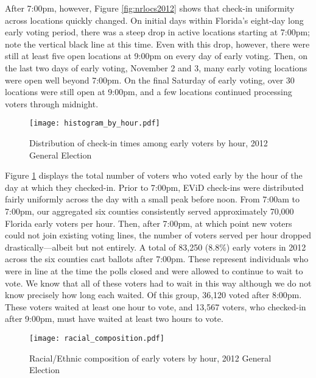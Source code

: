 \documentclass[12pt,titlepage]{article}
\begin{document}
After 7:00pm, however, Figure \ref{fig:nrlocs2012} shows that check-in
uniformity across locations quickly changed.  On initial days within
Florida's eight-day long early voting period, there was a steep drop
in active locations starting at 7:00pm; note the vertical black line
at this time.  Even with this drop, however, there were still at least
five open locations at 9:00pm on every day of early voting.  Then, on
the last two days of early voting, November 2 and 3, many early voting
locations were open well beyond 7:00pm.  On the final Saturday of
early voting, over 30 locations were still open at 9:00pm, and a few
locations continued processing voters through midnight.

\begin{figure}[!ht]
\caption{Distribution of check-in times among early voters by hour, 2012 General Election}
  \label{fig:hist2012}
  \centering
    \centering\texttt{[image: histogram\_by\_hour.pdf]}
\end{figure}

Figure \ref{fig:hist2012} displays the total number of voters who
voted early by the hour of the day at which they checked-in. Prior to
7:00pm, EViD check-ins were distributed fairly uniformly across the
day with a small peak before noon.  From 7:00am to 7:00pm, our
aggregated six counties consistently served approximately 70,000
Florida early voters per hour. Then, after 7:00pm, at which point new
voters could not join existing voting lines, the number of voters
served per hour dropped drastically---albeit but not entirely.  A
total of 83,250 (8.8\%) early voters in 2012 across the six counties
cast ballots after 7:00pm. These represent individuals who were in
line at the time the polls closed and were allowed to continue to wait
to vote.  We know that all of these voters had to wait in this way
although we do not know precisely how long each waited.  Of this
group, 36,120 voted after 8:00pm.  These voters waited at least one
hour to vote, and 13,567 voters, who checked-in after 9:00pm, must
have waited at least two hours to vote.




\begin{figure}[!ht]
\caption{Racial/Ethnic composition of early voters by hour, 2012 General Election}
  \label{fig:race2012}
  \centering
    \centering\texttt{[image: racial\_composition.pdf]}
\end{figure}
\end{document}

